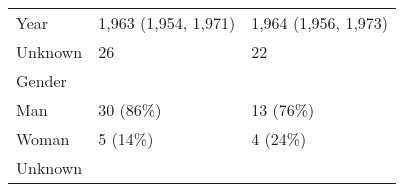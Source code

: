 \documentclass[
]{article}
\begin{document}
\begin{longtable}[]{@{}lll@{}}
\begin{minipage}[t]{0.57\columnwidth}\raggedright
Year\strut
\end{minipage} & \begin{minipage}[t]{0.18\columnwidth}\raggedright
1,963 (1,954, 1,971)\strut
\end{minipage} & \begin{minipage}[t]{0.17\columnwidth}\raggedright
1,964 (1,956, 1,973)\strut
\end{minipage}\tabularnewline
\begin{minipage}[t]{0.57\columnwidth}\raggedright
Unknown\strut
\end{minipage} & \begin{minipage}[t]{0.18\columnwidth}\raggedright
26\strut
\end{minipage} & \begin{minipage}[t]{0.17\columnwidth}\raggedright
22\strut
\end{minipage}\tabularnewline
\begin{minipage}[t]{0.57\columnwidth}\raggedright
Gender\strut
\end{minipage} & \begin{minipage}[t]{0.18\columnwidth}\raggedright
\strut
\end{minipage} & \begin{minipage}[t]{0.17\columnwidth}\raggedright
\strut
\end{minipage}\tabularnewline
\begin{minipage}[t]{0.57\columnwidth}\raggedright
Man\strut
\end{minipage} & \begin{minipage}[t]{0.18\columnwidth}\raggedright
30 (86\%)\strut
\end{minipage} & \begin{minipage}[t]{0.17\columnwidth}\raggedright
13 (76\%)\strut
\end{minipage}\tabularnewline
\begin{minipage}[t]{0.57\columnwidth}\raggedright
Woman\strut
\end{minipage} & \begin{minipage}[t]{0.18\columnwidth}\raggedright
5 (14\%)\strut
\end{minipage} & \begin{minipage}[t]{0.17\columnwidth}\raggedright
4 (24\%)\strut
\end{minipage}\tabularnewline
\begin{minipage}[t]{0.57\columnwidth}\raggedright
Unknown\strut
\end{minipage} & \begin{minipage}[t]{0.18\columnwidth}\raggedright

\end{minipage}
\end{longtable}
\end{document}
